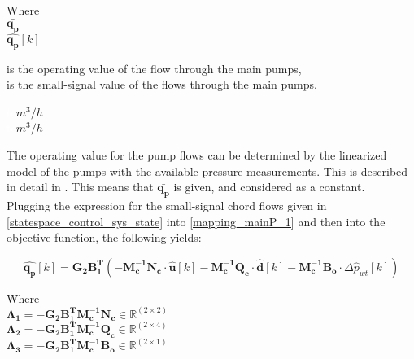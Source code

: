 \begin{minipage}[t]{0.20\textwidth}
Where\\
\hspace*{8mm} $ \bm{\bar{q_p}} $ \\
\hspace*{8mm} $ \bm{\hat{q_p}}[k] $ 
\end{minipage}
\begin{minipage}[t]{0.68\textwidth}
\vspace*{2mm}
is the operating value of the flow through the main pumps, \\
is the small-signal value of the flows through the main pumps. 
\end{minipage}
\begin{minipage}[t]{0.10\textwidth}
\textcolor{White}{te}$\unit{m^3/h}$\\
\textcolor{White}{te}$\unit{m^3/h}$
\end{minipage}


The operating value for the pump flows can be determined by the linearized model of the pumps with the available pressure measurements. This is described in detail in . This means that $\bm{\bar{q_p}}$ is given, and considered as a constant. 
\\
Plugging the expression for the small-signal chord flows given in \eqref{statespace_control_sys_state} into \eqref{mapping_mainP_1} and then into the objective function, the following yields:


 \begin{equation}
 \bm{\hat{q_{p}}}[k] =   \bm{G_{2}} \bm{B_{1}^T}(-\bm{M_c^{-1}}\bm{N_c} \cdot \bm{\hat{u}}[k] -\bm{M_c^{-1}}\bm{Q_c} \cdot \bm{\hat{d}}[k] -\bm{M_c^{-1}}\bm{B_{o}} \cdot \Delta \hat{p}_{wt}[k])   
 \label{mappingandstates}
\end{equation}

\begin{minipage}[t]{0.80\textwidth}
Where\\
\hspace*{8mm} $\bm{\Lambda_1} = -\bm{G_{2}} \bm{B_{1}^T}\bm{M_c^{-1}}\bm{N_c} \in \pmb{\mathbb{R}}^{(2 \times 2)}$ \\
\hspace*{8mm} $\bm{\Lambda_2} = -\bm{G_{2}} \bm{B_{1}^T}\bm{M_c^{-1}}\bm{Q_c} \in \pmb{\mathbb{R}}^{(2 \times 4)}$ \\
\hspace*{8mm} $\bm{\Lambda_3} = -\bm{G_{2}} \bm{B_{1}^T}\bm{M_c^{-1}}\bm{B_{o}} \in \pmb{\mathbb{R}}^{(2 \times 1)}$ 
\end{minipage}

